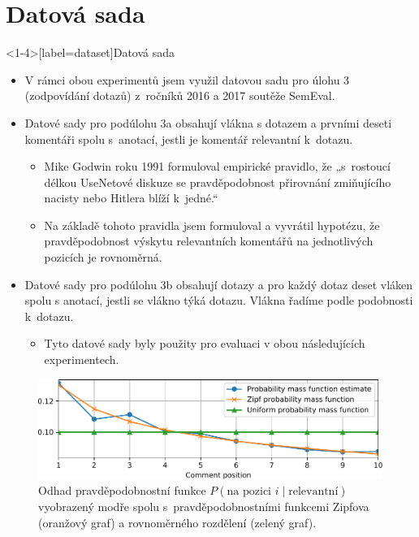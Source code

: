 \documentclass[aspectratio=169,t]{beamer}
\begin{document}
\section{Datová sada}
\begin{frame}<1-4>[label=dataset]{Datová sada}
\begin{itemize}
\item<1-> V rámci obou experimentů jsem využil datovou sadu pro úlohu 3
  (zodpovídání dotazů) z~ročníků 2016 a 2017 soutěže SemEval.
\item<2-> Datové sady pro podúlohu 3a obsahují \alert<2-6>{vlákna s dotazem a
  prvními deseti komentáři} spolu s~anotací, jestli \alert<2-6>{je komentář
  relevantní k~dotazu}.
  \begin{itemize}
    \item<3-> Mike Godwin roku 1991 formuloval empirické pravidlo, že
      „s~rostoucí délkou UseNetové diskuze se pravděpodobnost přirovnání
      zmiňujícího nacisty nebo Hitlera blíží k~jedné.“
    \item<4-> Na základě tohoto pravidla jsem formuloval a vyvrátil hypotézu, že
      \alert<4>{pravděpodobnost výskytu relevantních komentářů na jednotlivých
      pozicích je rovnoměrná}.
  \end{itemize}
\item<5-> Datové sady pro podúlohu 3b obsahují dotazy a \alert<5-6>{pro každý
  dotaz deset vláken} spolu s anotací, jestli se \alert<5-6>{vlákno týká dotazu}.
  Vlákna řadíme podle podobnosti k~dotazu.
  \begin{itemize}
    \item<6-> Tyto datové sady byly použity pro evaluaci v obou následujících
      experimentech.
  \end{itemize}
\end{itemize}
\end{frame}

\begin{frame}[c]
\begin{figure}
\vfill
\begin{center}
\includegraphics[scale=0.8]{figs/quality-evaluation-1}
\end{center}
\caption{Odhad pravděpodobnostní funkce $P(\text{na pozici }i\mid\text{relevantní})$
  vyobrazený modře spolu s~pravděpodobnostními funkcemi Zipfova (oranžový graf)
  a rovnoměrného rozdělení (zelený graf).}
\end{figure}
\end{frame}
\end{document}
